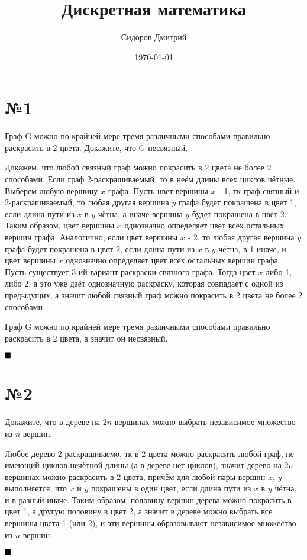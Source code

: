 \documentclass[a4paper, 16pt]{article}
\title{Дискретная математика}
\date{\today}
\author{Сидоров Дмитрий}
\affil{Группа БПМИ 219}
\newenvironment{proof}[1][Доказательство]{%
	\begin{trivlist}
		\item[\hskip \labelsep {\bfseries #1:}]
		\item \hspace{14pt}
	}{
		$ \hfill\blacksquare $
	\end{trivlist}
	\hfill\break
}
\begin{document}
	\maketitle
	
	\section*{№1}
	
	Граф
	G
	можно по крайней мере тремя различными способами правильно раскрасить в 2 цвета.
	Докажите, что
	G
	несвязный.
	
	\begin{proof}
		Докажем, что любой связный граф можно покрасить в 2 цвета не более 2 способами. Если граф 2-раскрашиваемый, то в неём длины всех циклов чётные. Выберем любую вершину $x$ графа. Пусть цвет вершины $x$ - 1, тк граф связный и 2-раскрашиваемый, то любая другая вершина $y$ графа будет покрашена в цвет 1, если длина пути из $x$ в $y$ чётна, а иначе вершина $y$ будет покрашена в цвет 2. Таким образом, цвет вершины $x$ однозначно определяет цвет всех остальных вершин графа. Аналогично, если цвет вершины $x$ - 2, то любая другая вершина $y$ графа будет покрашена в цвет 2, если длина пути из $x$ в $y$ чётна, в 1 иначе, и цвет вершины $x$ однозначно определяет цвет всех остальных вершин графа. Пусть существует 3-ий вариант раскраски связного графа. Тогда цвет $x$ либо 1, либо 2, а это уже даёт однозначную раскраску, которая совпадает с одной из предыдущих, а значит любой связный граф можно покрасить в 2 цвета не более 2 способами.
		
		Граф
		G
		можно по крайней мере тремя различными способами правильно раскрасить в 2 цвета, а значит он несвязный.
	\end{proof}
	
	\section*{№2}
	Докажите, что в дереве на
	$2n$
	вершинах можно выбрать независимое множество из
	$n$
	вершин.
	
	\begin{proof}
		
		Любое дерево 2-раскрашиваемо, тк в 2 цвета можно раскрасить любой граф, не имеющий циклов нечётной длины (а в дереве нет циклов), значит дерево на $2n$ вершинах можно раскрасить в 2 цвета, причём для любой пары вершин $x$, $y$ выполняется, что $x$ и $y$ покрашены в один цвет, если длина пути из $x$ в $y$ чётна, и в разный иначе. Таким образом, половину вершин дерева можно покрасить в цвет 1, а другую половину в цвет 2, а значит в дереве можно выбрать все вершины цвета 1 (или 2), и эти вершины образовывают независимое множество из $n$ вершин.
		
	\end{proof}
	
\end{document}
